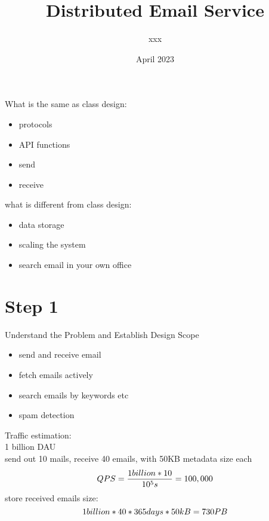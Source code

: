 \documentclass{article}
\title{Distributed Email Service}
\author{xxx}
\date{April 2023}
\begin{document}
\maketitle
What is the same as class design:
\begin{itemize}
    \item protocols
    \item API functions
    \item send
    \item receive
\end{itemize}
what is different from class design:
\begin{itemize}
    \item data storage
    \item scaling the system
    \item search email in your own office
\end{itemize}
\section{Step 1}
Understand the Problem and Establish Design Scope
\begin{itemize}
    \item send and receive email
    \item fetch emails actively
    \item search emails by keywords etc
    \item spam detection
\end{itemize}
Traffic estimation:\\
1 billion DAU\\
send out 10 mails, receive 40 emails, with 50KB metadata size each\\
\begin{equation}
    QPS = \frac{1 billion * 10}{10^5 s} = 100,000\\
\end{equation}
store received emails size:\\
\begin{equation}
    1 billion * 40 * 365 days * 50kB = 730PB\\
\end{equation}
\end{document}
